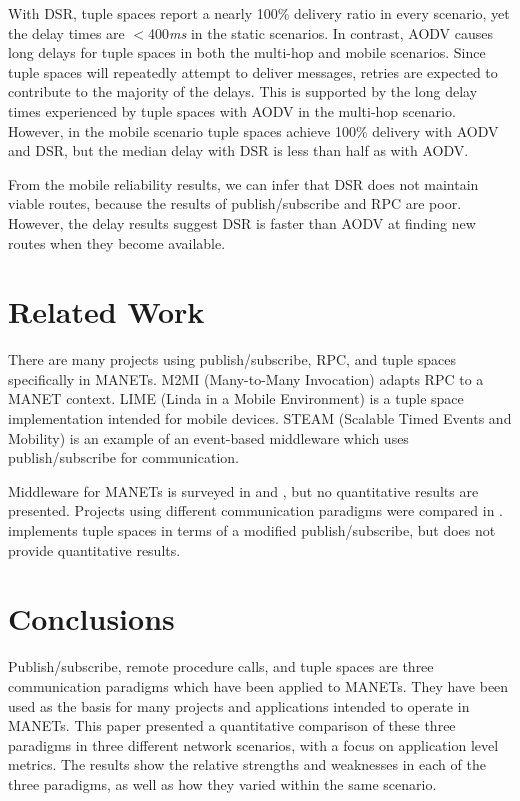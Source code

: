 \documentclass[lnicst]{svmultln}
\begin{document}
With DSR, tuple spaces report a nearly 100\% delivery ratio in every scenario, yet the delay times are $<$400\textit{ms} in the static scenarios. In contrast, AODV causes long delays for tuple spaces in both the multi-hop and mobile scenarios. Since tuple spaces will repeatedly attempt to deliver messages, retries are expected to contribute to the majority of the delays. This is supported by the long delay times experienced by tuple spaces with AODV in the multi-hop scenario. However, in the mobile scenario tuple spaces achieve 100\% delivery with AODV and DSR, but the median delay with DSR is less than half as with AODV.

From the mobile reliability results, we can infer that DSR does not maintain viable routes, because the results of publish/subscribe and RPC are poor. However, the delay results suggest DSR is faster than AODV at finding new routes when they become available.

\section{Related Work}

There are many projects using publish/subscribe, RPC, and tuple spaces specifically in MANETs. M2MI (Many-to-Many Invocation)\cite{m2mi} adapts RPC to a MANET context. LIME (Linda in a Mobile Environment)\cite{lime} is a tuple space implementation intended for mobile devices. STEAM (Scalable Timed Events and Mobility)\cite{steam} is an example of an event-based middleware which uses publish/subscribe for communication.

Middleware for MANETs is surveyed in \cite{mwtrends} and \cite{mwsurvey}, but no quantitative results are presented. Projects using different communication paradigms were compared in \cite{mine}. \cite{psvsts} implements tuple spaces in terms of a modified publish/subscribe, but does not provide quantitative results.


\section{Conclusions}

Publish/subscribe, remote procedure calls, and tuple spaces are three communication paradigms which have been applied to MANETs. They have been used as the basis for many projects and applications intended to operate in MANETs. This paper presented a quantitative comparison of these three paradigms in three different network scenarios, with a focus on application level metrics. The results show the relative strengths and weaknesses in each of the three paradigms, as well as how they varied within the same scenario.
\end{document}
